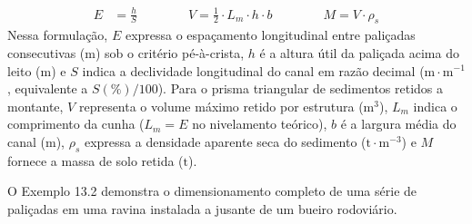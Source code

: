\begin{boxFormula}
\begin{align}
  E &= \frac{h}{S} \qquad\qquad V = \frac{1}{2} \cdot L_m \cdot h \cdot b \qquad\qquad M = V \cdot \rho_s
\end{align}
Nessa formulação, $E$ expressa o espaçamento longitudinal entre paliçadas consecutivas ($\text{m}$) sob o critério pé-à-crista, $h$ é a altura útil da paliçada acima do leito ($\text{m}$) e $S$ indica a declividade longitudinal do canal em razão decimal ($\text{m}\cdot\text{m}^{-1}$, equivalente a $S(\%)/100$). Para o prisma triangular de sedimentos retidos a montante, $V$ representa o volume máximo retido por estrutura ($\text{m}^3$), $L_m$ indica o comprimento da cunha ($L_m = E$ no nivelamento teórico), $b$ é a largura média do canal ($\text{m}$), $\rho_s$ expressa a densidade aparente seca do sedimento ($\text{t}\cdot\text{m}^{-3}$) e $M$ fornece a massa de solo retida ($\text{t}$).
\end{boxFormula}

O Exemplo 13.2 demonstra o dimensionamento completo de uma série de paliçadas em uma ravina instalada a jusante de um bueiro rodoviário.

